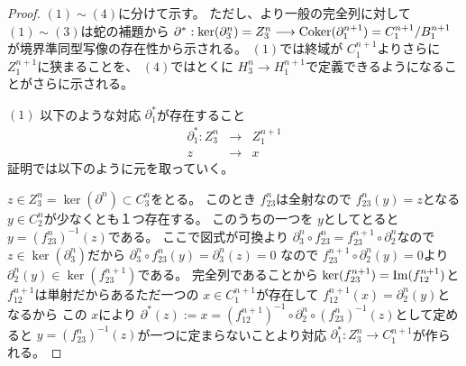 \documentclass[dvipdfmx]{jsarticle}
\begin{document}
\begin{proof}
  $(1) \sim (4)$に分けて示す。
  ただし、より一般の完全列に対して $(1) \sim (3)$は蛇の補題から $\partial^* : \ker(\partial^n_3) = Z^n_3 \longrightarrow \mathop{\mathrm{Coker}}\nolimits(\partial^{n+1}_1) = C^{n+1}_1 / B^{n+1}_1$が境界準同型写像の存在性から示される。
  $(1)$では終域が $C^{n+1}_1$よりさらに $Z^{n+1}_1$に狭まることを、
  $(4)$ではとくに $H^n_3 \longrightarrow H^{n+1}_1$で定義できるようになることがさらに示される。

  $(1)$
  以下のような対応 $\partial^*_1$が存在すること
  \begin{eqnarray*}
    \partial^*_1 : Z^n_3 & \longrightarrow & Z^{n+1}_1 \\
    z & \longrightarrow & x
  \end{eqnarray*}
  証明では以下のように元を取っていく。
  \begin{center}
  \end{center}

  $z \in Z^n_3 = \ker(\partial^n) \subset C^n_3$をとる。
  このとき $f_{23}^n$は全射なので $f_{23}^n(y) = z$となる $y \in C^n_2$が少なくとも１つ存在する。
  このうちの一つを $y$としてとると $y = (f_{23}^n)^{-1}(z)$である。
  ここで図式が可換より $\partial^n_3 \circ f_{23}^n = f_{23}^{n+1} \circ \partial^n_2$なので
  $z \in \ker(\partial^n_3)$だから
  $\partial^n_3 \circ f_{23}^n(y) = \partial^n_3(z) = 0$
  なので $f_{23}^{n+1} \circ \partial^n_2(y) = 0$より $\partial^n_2(y) \in \ker(f_{23}^{n+1})$である。
  完全列であることから $\ker(f_{23}^{n+1}) = \mathop{\mathrm{Im}}\nolimits(f_{12}^{n+1})$と
  $f_{12}^{n+1}$は単射だからあるただ一つの $x \in C^{n+1}_1$が存在して
  $f_{12}^{n+1}(x) = \partial^n_2(y)$となるから
  この $x$により $\partial^*(z) := x = (f_{12}^{n+1})^{-1} \circ \partial^n_2 \circ (f_{23}^n)^{-1}(z)$として定めると
  $y = (f_{23}^n)^{-1}(z)$が一つに定まらないことより対応 $\partial^*_1 : Z^n_3 \longrightarrow C^{n+1}_1$が作られる。


\end{proof}
\end{document}
